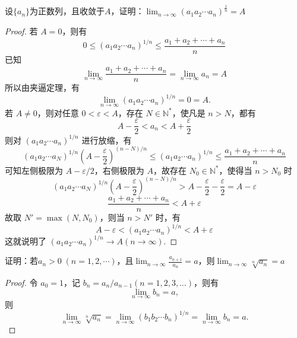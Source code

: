 \documentclass[lang=cn,12pt]{elegantbook}
\begin{document}
\begin{example}
    设$\{a_n\}$为正数列，且收敛于$A$，证明：$ \lim_{n \to \infty}(a_1a_2\cdots a_n)^{\frac{1}{n}} = A$
\end{example}

\begin{proof}
     若 \( A = 0 \)，则有
\[
0 \leq (a_1 a_2 \cdots a_n)^{1/n} \leq \frac{a_1 + a_2 + \cdots + a_n}{n}
\]
已知
\[
\lim_{n \to \infty} \frac{a_1 + a_2 + \cdots + a_n}{n} = \lim_{n \to \infty} a_n = A
\]
所以由夹逼定理，有
\[
\lim_{n \to \infty} (a_1 a_2 \cdots a_n)^{1/n} = 0 = A.
\]
若 \( A \neq 0 \)，则对任意 \( 0 < \varepsilon < A \)，存在 \( N \in \mathbb{N}^* \)，使凡是 \( n > N \)，都有
\[
A - \frac{\varepsilon}{2} < a_n < A + \frac{\varepsilon}{2}
\]
则对 \((a_1 a_2 \cdots a_n)^{1/n}\) 进行放缩，有
\[
(a_1 a_2 \cdots a_N)^{1/n} \left( A - \frac{\varepsilon}{2} \right)^{(n-N)/n} \leq (a_1 a_2 \cdots a_n)^{1/n} \leq \frac{a_1 + a_2 + \cdots + a_n}{n}
\]
可知左侧极限为 \( A - \varepsilon / 2 \)，右侧极限为 \( A \)，故存在 \( N_0 \in \mathbb{N}^* \)，使得当 \( n > N_0 \) 时
\[
(a_1 a_2 \cdots a_N)^{1/n} \left( A - \frac{\varepsilon}{2} \right)^{(n-N)/n} > A - \frac{\varepsilon}{2} - \frac{\varepsilon}{2} = A - \varepsilon
\]
\[
\frac{a_1 + a_2 + \cdots + a_n}{n} < A + \varepsilon
\]
故取 \( N' = \max(N, N_0) \)，则当 \( n > N' \) 时，有
\[
A - \varepsilon < (a_1 a_2 \cdots a_n)^{1/n} < A + \varepsilon
\]
这就说明了 \((a_1 a_2 \cdots a_n)^{1/n} \to A(n \to \infty)\).
\end{proof}

\begin{example}
    证明：若$a_n>0\;(n= 1,2,\cdots)$，且$\lim_{n \to \infty}\frac{a_{n+1}}{a_n} = a$，则$\lim_{n \to \infty} \sqrt[n]{a_n} = a$
\end{example}

\begin{proof}
    令 \( a_0 = 1 \)，记 \( b_n = a_n / a_{n-1} (n = 1, 2, 3, \ldots) \)，则有
\[
\lim_{n \to \infty} b_n = a,
\]
则
\[
\lim_{n \to \infty} \sqrt[n]{a_n} = \lim_{n \to \infty} (b_1 b_2 \cdots b_n)^{1/n} = \lim_{n \to \infty} b_n = a.
\]
\end{proof}
\end{document}
